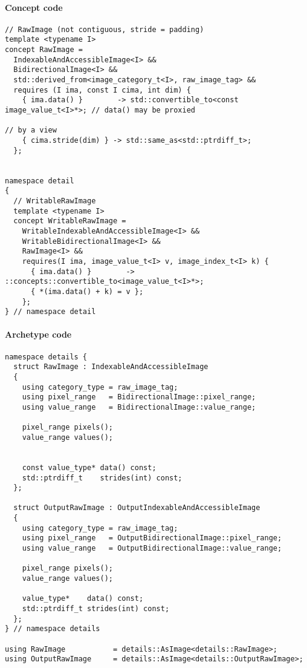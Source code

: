 \paragraph{Concept code}

\begin{verbatim}
// RawImage (not contiguous, stride = padding)
template <typename I>
concept RawImage =
  IndexableAndAccessibleImage<I> &&
  BidirectionalImage<I> &&
  std::derived_from<image_category_t<I>, raw_image_tag> &&
  requires (I ima, const I cima, int dim) {
    { ima.data() }        -> std::convertible_to<const image_value_t<I>*>; // data() may be proxied
                                                                           // by a view
    { cima.stride(dim) } -> std::same_as<std::ptrdiff_t>;
  };


namespace detail
{
  // WritableRawImage
  template <typename I>
  concept WritableRawImage =
    WritableIndexableAndAccessibleImage<I> &&
    WritableBidirectionalImage<I> &&
    RawImage<I> &&
    requires(I ima, image_value_t<I> v, image_index_t<I> k) {
      { ima.data() }        -> ::concepts::convertible_to<image_value_t<I>*>;
      { *(ima.data() + k) = v };
    };
} // namespace detail
\end{verbatim}


\paragraph{Archetype code}

\begin{verbatim}
namespace details {
  struct RawImage : IndexableAndAccessibleImage
  {
    using category_type = raw_image_tag;
    using pixel_range   = BidirectionalImage::pixel_range;
    using value_range   = BidirectionalImage::value_range;

    pixel_range pixels();
    value_range values();


    const value_type* data() const;
    std::ptrdiff_t    strides(int) const;
  };

  struct OutputRawImage : OutputIndexableAndAccessibleImage
  {
    using category_type = raw_image_tag;
    using pixel_range   = OutputBidirectionalImage::pixel_range;
    using value_range   = OutputBidirectionalImage::value_range;

    pixel_range pixels();
    value_range values();

    value_type*    data() const;
    std::ptrdiff_t strides(int) const;
  };
} // namespace details

using RawImage           = details::AsImage<details::RawImage>;
using OutputRawImage     = details::AsImage<details::OutputRawImage>;
\end{verbatim}



